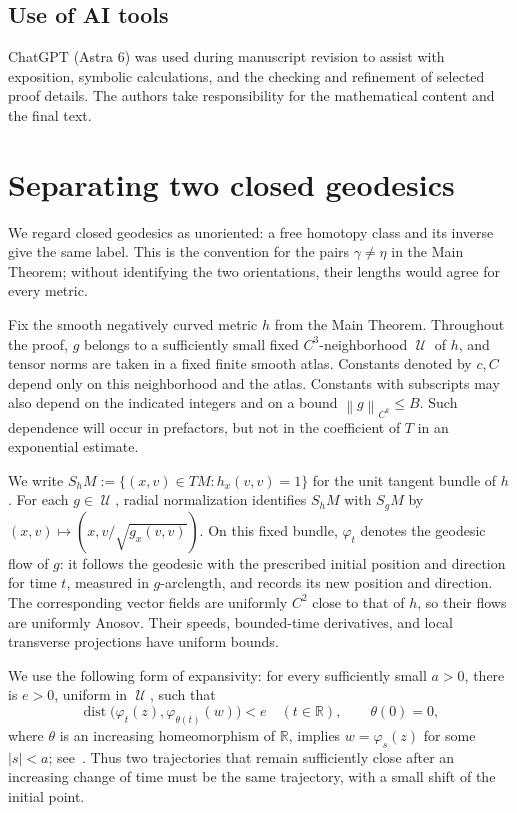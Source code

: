 \documentclass[10pt,oneside,reqno]{amsproc}
\numberwithin{equation}{section}
\theoremstyle{definition}
\theoremstyle{remark}
\newcommand{\norm}[1]{\left\|#1\right\|}
\DeclareMathOperator{\dist}{dist}
\DeclareMathOperator{\cU}{{\mathscr U}}
\renewcommand{\le}{\leqslant}
\begin{document}
\medskip
\subsection*{Use of AI tools} ChatGPT (Astra 6) was used during manuscript revision to assist with exposition, symbolic calculations, and the checking and refinement of selected proof details. The authors take responsibility for the mathematical content and the final text.


\section{Separating two closed geodesics}
\label{geo:section}

We regard closed geodesics as unoriented: a free homotopy class and its inverse give the same label. This is the convention for the pairs $\gamma\ne\eta$ in the Main Theorem; without identifying the two orientations, their lengths would agree for every metric.

Fix the smooth negatively curved metric $h$ from the Main Theorem. Throughout the proof, $g$ belongs to a sufficiently small fixed $C^3$-neighborhood $\cU$ of $h$, and tensor norms are taken in a fixed finite smooth atlas. Constants denoted by $c,C$ depend only on this neighborhood and the atlas. Constants with subscripts may also depend on the indicated integers and on a bound $\norm{g}_{C^k}\le B$. Such dependence will occur in prefactors, but not in the coefficient of $T$ in an exponential estimate.

We write $S_hM:=\{(x,v)\in TM:h_x(v,v)=1\}$ for the unit tangent bundle of $h$. For each $g\in\cU$, radial normalization identifies $S_hM$ with $S_gM$ by $(x,v)\mapsto(x,v/\sqrt{g_x(v,v)})$. On this fixed bundle, $\varphi_t$ denotes the geodesic flow of $g$: it follows the geodesic with the prescribed initial position and direction for time $t$, measured in $g$-arclength, and records its new position and direction. The corresponding vector fields are uniformly $C^2$ close to that of $h$, so their flows are uniformly Anosov. Their speeds, bounded-time derivatives, and local transverse projections have uniform bounds.

We use the following form of expansivity: for every sufficiently small $a>0$, there is $e>0$, uniform in $\cU$, such that
\[
 \dist\bigl(\varphi_t(z),\varphi_{\theta(t)}(w)\bigr)<e\quad(t\in\mathbb R),\qquad \theta(0)=0,
\]
where $\theta$ is an increasing homeomorphism of $\mathbb R$, implies $w=\varphi_s(z)$ for some $|s|<a$; see~\cite{Bowen,BW}. Thus two trajectories that remain sufficiently close after an increasing change of time must be the same trajectory, with a small shift of the initial point.
\end{document}
